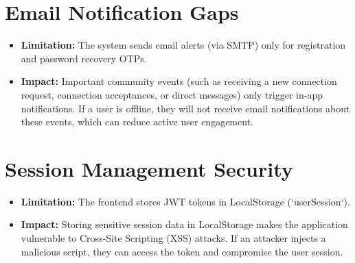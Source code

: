 \section{Email Notification Gaps}
\begin{itemize}
    \item \textbf{Limitation:} The system sends email alerts (via SMTP) only for registration and password recovery OTPs.
    \item \textbf{Impact:} Important community events (such as receiving a new connection request, connection acceptances, or direct messages) only trigger in-app notifications. If a user is offline, they will not receive email notifications about these events, which can reduce active user engagement.
\end{itemize}

\section{Session Management Security}
\begin{itemize}
    \item \textbf{Limitation:} The frontend stores JWT tokens in LocalStorage (`userSession`).
    \item \textbf{Impact:} Storing sensitive session data in LocalStorage makes the application vulnerable to Cross-Site Scripting (XSS) attacks. If an attacker injects a malicious script, they can access the token and compromise the user session.
\end{itemize}
